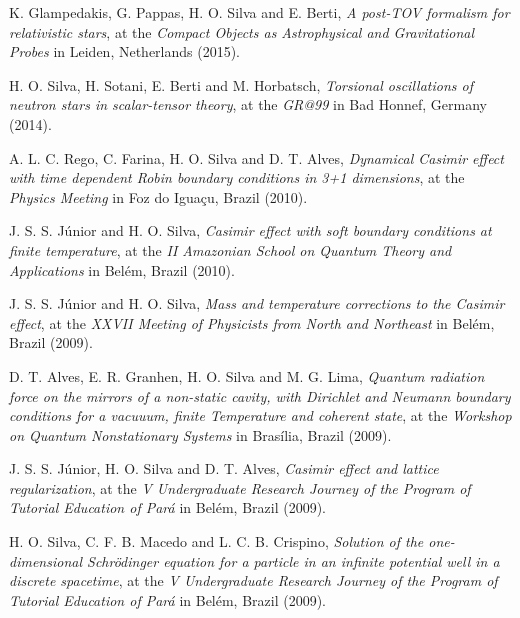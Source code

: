 \documentclass[10pt]{article}
\begin{document}
\begin{bibenum}

    \item K. Glampedakis, G. Pappas, H. O. Silva and E. Berti,
    \emph{A post-TOV formalism for relativistic stars},
    at the \emph{Compact Objects as Astrophysical and Gravitational Probes}
    in Leiden, Netherlands (2015).

    \item H. O. Silva, H. Sotani, E. Berti and M. Horbatsch,
    \emph{Torsional oscillations of neutron stars in scalar-tensor theory},
    at the \emph{GR@99}
    in Bad Honnef, Germany (2014).

    \item A. L. C. Rego, C. Farina, H. O. Silva and D. T. Alves,
    \emph{Dynamical Casimir effect with time dependent Robin
    boundary conditions in 3+1 dimensions},
    at the \emph{Physics Meeting}
    in Foz do Igua\c{c}u, Brazil (2010).

    \item J. S. S. J\'unior and H. O. Silva,
    \emph{Casimir effect with soft boundary conditions at finite temperature},
    at the \emph{II Amazonian School on Quantum Theory and Applications}
    in Bel\'em, Brazil (2010).

    \item J. S. S. J\'unior and H. O. Silva,
    \emph{Mass and temperature corrections to the Casimir effect},
    at the \emph{XXVII Meeting of Physicists from North and Northeast}
    in Bel\'em, Brazil (2009).

    \item D. T. Alves, E. R. Granhen, H. O. Silva and M. G. Lima,
    \emph{Quantum radiation force on the mirrors of a non-static cavity,
    with Dirichlet and Neumann boundary conditions for a vacuuum,
    finite Temperature and coherent state},
    at the \emph{Workshop on Quantum Nonstationary Systems}
    in Bras\'ilia, Brazil (2009).

    \item J. S. S. J\'unior, H. O. Silva and D. T. Alves,
    \emph{Casimir effect and lattice regularization},
    at the \emph{V Undergraduate Research Journey of the Program of
    Tutorial Education of Par\'a} in Bel\'em, Brazil (2009).

    \item H. O. Silva, C. F. B. Macedo and L. C. B. Crispino,
    \emph{Solution of the one-dimensional Schr\"odinger equation for a
    particle in an infinite potential well in a discrete spacetime},
    at the \emph{V Undergraduate Research Journey of the Program of
    Tutorial Education of Par\'a} in Bel\'em, Brazil (2009).

\end{bibenum}
\end{document}
